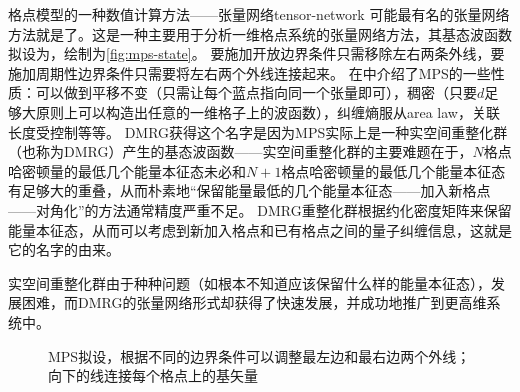 \begin{back}{格点模型的一种数值计算方法——张量网络}{tensor-network}
    可能最有名的张量网络方法就是了。这是一种主要用于分析一维格点系统的张量网络方法，其基态波函数拟设为，绘制为\autoref{fig:mps-state}。
    要施加开放边界条件只需移除左右两条外线，要施加周期性边界条件只需要将左右两个外线连接起来。
    在\cite{Orus_tensor}中介绍了MPS的一些性质：可以做到平移不变（只需让每个蓝点指向同一个张量即可），稠密（只要$d$足够大原则上可以构造出任意的一维格子上的波函数），纠缠熵服从area law，关联长度受控制等等。
    DMRG获得这个名字是因为MPS实际上是一种实空间重整化群（也称为DMRG）产生的基态波函数——实空间重整化群的主要难题在于，$N$格点哈密顿量的最低几个能量本征态未必和$N+1$格点哈密顿量的最低几个能量本征态有足够大的重叠，从而朴素地“保留能量最低的几个能量本征态——加入新格点——对角化”的方法通常精度严重不足。
    DMRG重整化群根据约化密度矩阵来保留能量本征态，从而可以考虑到新加入格点和已有格点之间的量子纠缠信息，这就是它的名字的由来。

    实空间重整化群由于种种问题（如根本不知道应该保留什么样的能量本征态），发展困难，而DMRG的张量网络形式却获得了快速发展，并成功地推广到更高维系统中。
\end{back}

\begin{figure}
    \centering
    
    \caption{MPS拟设，根据不同的边界条件可以调整最左边和最右边两个外线；向下的线连接每个格点上的基矢量}
    \label{fig:mps-state}
\end{figure}